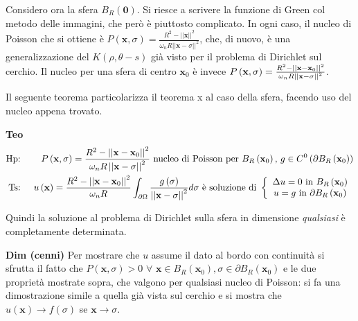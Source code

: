 \documentclass{article}
\begin{document}
Considero ora la sfera $B_{R}\left( \mathbf{0}\right) $. Si riesce a
scrivere la funzione di Green col metodo delle immagini, che per\`{o} \`{e}
piuttosto complicato. In ogni caso, il nucleo di Poisson che si ottiene \`{e}
$P\left( \mathbf{x},\sigma \right) =\frac{R^{2}-\left\vert \left\vert 
\mathbf{x}\right\vert \right\vert ^{2}}{\omega _{n}R\left\vert \left\vert 
\mathbf{x}-\sigma \right\vert \right\vert ^{2}}$, che, di nuovo, \`{e} una
generalizzazione del $K\left( \rho ,\theta -s\right) $ gi\`{a} visto per il
problema di Dirichlet sul cerchio. Il nucleo per una sfera di centro $%
\mathbf{x}_{0}$ \`{e} invece $P\left( \mathbf{x},\sigma \right) =\frac{%
R^{2}-\left\vert \left\vert \mathbf{x-x}_{0}\right\vert \right\vert ^{2}}{%
\omega _{n}R\left\vert \left\vert \mathbf{x}-\sigma \right\vert \right\vert
^{2}}$.

Il seguente teorema particolarizza il teorema x al caso della sfera, facendo
uso del nucleo appena trovato.

\textbf{Teo}%
\begin{eqnarray*}
\text{Hp}\text{: } &&P\left( \mathbf{x},\sigma \right) =\frac{%
R^{2}-\left\vert \left\vert \mathbf{x-x}_{0}\right\vert \right\vert ^{2}}{%
\omega _{n}R\left\vert \left\vert \mathbf{x}-\sigma \right\vert \right\vert
^{2}}\text{ nucleo di Poisson per }B_{R}\left( \mathbf{x}_{0}\right) \text{, 
}g\in C^{0}\left( \partial B_{R}\left( \mathbf{x}_{0}\right) \right) \\
\text{Ts}\text{: } &&u\left( \mathbf{x}\right) =\frac{R^{2}-\left\vert
\left\vert \mathbf{x-x}_{0}\right\vert \right\vert ^{2}}{\omega _{n}R}%
\int_{\partial \Omega }\frac{g\left( \sigma \right) }{\left\vert \left\vert 
\mathbf{x}-\sigma \right\vert \right\vert ^{2}}d\sigma \text{ \`{e}
soluzione di }\left\{ 
\begin{array}{c}
\Delta u=0\text{ in }B_{R}\left( \mathbf{x}_{0}\right) \\ 
u=g\text{ in }\partial B_{R}\left( \mathbf{x}_{0}\right)%
\end{array}%
\right.
\end{eqnarray*}

Quindi la soluzione al problema di Dirichlet sulla sfera in dimensione 
\textit{qualsiasi} \`{e} completamente determinata.

\textbf{Dim (cenni)} Per mostrare che $u$ assume il dato al bordo con
continuit\`{a} si sfrutta il fatto che $P\left( \mathbf{x},\sigma \right) >0$
$\forall $ $\mathbf{x}\in B_{R}\left( \mathbf{x}_{0}\right) ,\sigma \in
\partial B_{R}\left( \mathbf{x}_{0}\right) $ e le due propriet\`{a} mostrate
sopra, che valgono per qualsiasi nucleo di Poisson: si fa una dimostrazione
simile a quella gi\`{a} vista sul cerchio e si mostra che $u\left( \mathbf{x}%
\right) \rightarrow f\left( \sigma \right) $ se $\mathbf{x}\rightarrow
\sigma $.
\end{document}
